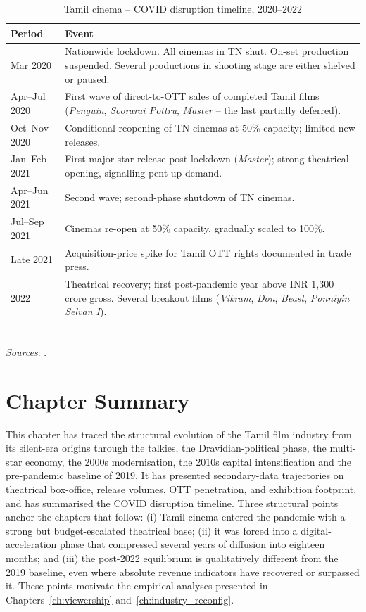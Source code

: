 \begin{table}[h]
\centering
\caption{Tamil cinema -- COVID disruption timeline, 2020--2022}
\label{tab:covid_timeline}
\small
\begin{tabular}{p{2.4cm} p{12.0cm}}
\toprule
\textbf{Period} & \textbf{Event} \\
\midrule
Mar 2020 & Nationwide lockdown.  All cinemas in TN shut.  On-set
production suspended.  Several productions in shooting stage are
either shelved or paused. \\
Apr--Jul 2020 & First wave of direct-to-OTT sales of completed Tamil
films (\emph{Penguin}, \emph{Soorarai Pottru}, \emph{Master} -- the
last partially deferred). \\
Oct--Nov 2020 & Conditional reopening of TN cinemas at 50\% capacity;
limited new releases. \\
Jan--Feb 2021 & First major star release post-lockdown
(\emph{Master}); strong theatrical opening, signalling pent-up
demand. \\
Apr--Jun 2021 & Second wave; second-phase shutdown of TN cinemas. \\
Jul--Sep 2021 & Cinemas re-open at 50\% capacity, gradually scaled
to 100\%. \\
Late 2021 & Acquisition-price spike for Tamil OTT rights documented
in trade press. \\
2022 & Theatrical recovery; first post-pandemic year above
INR 1{,}300 crore gross.  Several breakout films (\emph{Vikram},
\emph{Don}, \emph{Beast}, \emph{Ponniyin Selvan I}). \\
\bottomrule
\end{tabular}
\\\smallskip
\textit{Sources}: \citet{thehindu2021lockdown,economictimes2021reopening,
filmcompanion2021directott,filmcompanion2022mid,ficciey2021,
ficciey2022}.
\end{table}

\section{Chapter Summary}
\label{sec:overview_summary}

This chapter has traced the structural evolution of the Tamil film
industry from its silent-era origins through the talkies, the
Dravidian-political phase, the multi-star economy, the 2000s
modernisation, the 2010s capital intensification and the
pre-pandemic baseline of 2019.  It has presented secondary-data
trajectories on theatrical box-office, release volumes, OTT
penetration, and exhibition footprint, and has summarised the COVID
disruption timeline.  Three structural points anchor the chapters
that follow: (i) Tamil cinema entered the pandemic with a strong but
budget-escalated theatrical base; (ii) it was forced into a
digital-acceleration phase that compressed several years of
diffusion into eighteen months; and (iii) the post-2022 equilibrium
is qualitatively different from the 2019 baseline, even where
absolute revenue indicators have recovered or surpassed it.  These
points motivate the empirical analyses presented in
Chapters~\ref{ch:viewership} and~\ref{ch:industry_reconfig}.
